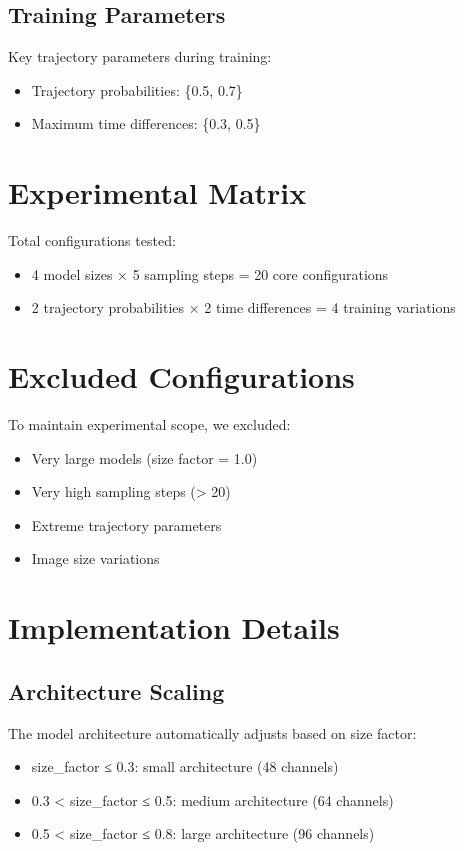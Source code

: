 \documentclass{article}
\begin{document}
\subsection{Training Parameters}
Key trajectory parameters during training:
\begin{itemize}
    \item Trajectory probabilities: \{0.5, 0.7\}
    \item Maximum time differences: \{0.3, 0.5\}
\end{itemize}

\section{Experimental Matrix}
Total configurations tested:
\begin{itemize}
    \item 4 model sizes × 5 sampling steps = 20 core configurations
    \item 2 trajectory probabilities × 2 time differences = 4 training variations
\end{itemize}

\section{Excluded Configurations}
To maintain experimental scope, we excluded:
\begin{itemize}
    \item Very large models (size factor = 1.0)
    \item Very high sampling steps (> 20)
    \item Extreme trajectory parameters
    \item Image size variations
\end{itemize}

\section{Implementation Details}
\subsection{Architecture Scaling}
The model architecture automatically adjusts based on size factor:
\begin{itemize}
    \item size\_factor ≤ 0.3: small architecture (48 channels)
    \item 0.3 < size\_factor ≤ 0.5: medium architecture (64 channels)
    \item 0.5 < size\_factor ≤ 0.8: large architecture (96 channels)
\end{itemize}
\end{document}
